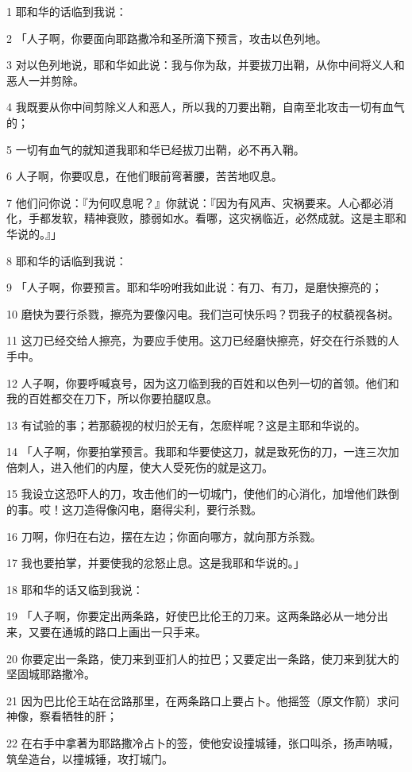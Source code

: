 \par 1 耶和华的话临到我说：
\par 2 「人子啊，你要面向耶路撒冷和圣所滴下预言，攻击以色列地。
\par 3 对以色列地说，耶和华如此说：我与你为敌，并要拔刀出鞘，从你中间将义人和恶人一并剪除。
\par 4 我既要从你中间剪除义人和恶人，所以我的刀要出鞘，自南至北攻击一切有血气的；
\par 5 一切有血气的就知道我耶和华已经拔刀出鞘，必不再入鞘。
\par 6 人子啊，你要叹息，在他们眼前弯著腰，苦苦地叹息。
\par 7 他们问你说：『为何叹息呢？』你就说：『因为有风声、灾祸要来。人心都必消化，手都发软，精神衰败，膝弱如水。看哪，这灾祸临近，必然成就。这是主耶和华说的。』」
\par 8 耶和华的话临到我说：
\par 9 「人子啊，你要预言。耶和华吩咐我如此说：有刀、有刀，是磨快擦亮的；
\par 10 磨快为要行杀戮，擦亮为要像闪电。我们岂可快乐吗？罚我子的杖藐视各树。
\par 11 这刀已经交给人擦亮，为要应手使用。这刀已经磨快擦亮，好交在行杀戮的人手中。
\par 12 人子啊，你要呼喊哀号，因为这刀临到我的百姓和以色列一切的首领。他们和我的百姓都交在刀下，所以你要拍腿叹息。
\par 13 有试验的事；若那藐视的杖归於无有，怎麽样呢？这是主耶和华说的。
\par 14 「人子啊，你要拍掌预言。我耶和华要使这刀，就是致死伤的刀，一连三次加倍刺人，进入他们的内屋，使大人受死伤的就是这刀。
\par 15 我设立这恐吓人的刀，攻击他们的一切城门，使他们的心消化，加增他们跌倒的事。哎！这刀造得像闪电，磨得尖利，要行杀戮。
\par 16 刀啊，你归在右边，摆在左边；你面向哪方，就向那方杀戮。
\par 17 我也要拍掌，并要使我的忿怒止息。这是我耶和华说的。」
\par 18 耶和华的话又临到我说：
\par 19 「人子啊，你要定出两条路，好使巴比伦王的刀来。这两条路必从一地分出来，又要在通城的路口上画出一只手来。
\par 20 你要定出一条路，使刀来到亚扪人的拉巴；又要定出一条路，使刀来到犹大的坚固城耶路撒冷。
\par 21 因为巴比伦王站在岔路那里，在两条路口上要占卜。他摇签（原文作箭）求问神像，察看牺牲的肝；
\par 22 在右手中拿著为耶路撒冷占卜的签，使他安设撞城锤，张口叫杀，扬声呐喊，筑垒造台，以撞城锤，攻打城门。
